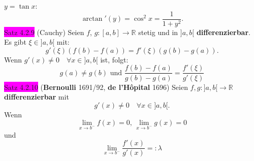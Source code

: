 \documentclass[landscape, 10pt]{article}
\newcommand{\R}{\mathbb{R}}
\begin{document}
\begin{multicols}{3}
                            \textcolor{NavyBlue}{
                            $y=\tan x$}: 
                            \begin{equation*}
                                  \arctan'(y)
                                  =\cos^2x=\frac{1}{1+y^2}.
                            \end{equation*}
              \colorbox{magenta}{Satz 4.2.9} 
              (Cauchy)
                     Seien 
                     \textcolor{NavyBlue}{$f$},
                     \textcolor{NavyBlue}{$g:[a,b]\longrightarrow\R$}
                     stetig und in \textcolor{NavyBlue}{$]a,b[$} 
                     \textbf{differenzierbar}. Es gibt 
                     \textcolor{NavyBlue}{$\xi\in]a,b[$} mit:
                     \begin{equation*}
                            g'(\xi)(f(b)-f(a))
                            =f'(\xi)(g(b)-g(a)).
                     \end{equation*} 
                     Wenn \textcolor{NavyBlue}{
                     $g'(x)\neq0\quad\forall x\in]a,b[$} 
                     ist, folgt: 
                     \begin{equation*}
                            g(a)\neq g(b)
                            \text{ und }
                            \frac{f(b)-f(a)}{g(b)-g(a)}
                            =\frac{f'(\xi)}{g'(\xi)}
                     \end{equation*}
              \colorbox{magenta}{Satz 4.2.10} 
              (\textbf{Bernoulli} 1691/92, 
              \textbf{de l'Hôpital} 1696) 
                     Seien \textcolor{NavyBlue}{
                     $f,g:]a,b[\longrightarrow\R$} 
                     \textbf{differenzierbar} mit 
                     \begin{equation*}
                           g'(x)\neq0\quad\forall x\in]a,b[.
                     \end{equation*}
                     Wenn 
                     \begin{equation*}
                            \lim\limits_{x\to b^{-}}f(x)=0,\,
                            \lim\limits_{x\to b^{-}}g(x)=0   
                     \end{equation*}
                     und 
                     \begin{equation*}
                            \lim\limits_{x\to b^{-}}
                            \frac{f'(x)}{g'(x)}=:\lambda
                     \end{equation*}

\end{multicols}
\end{document}
